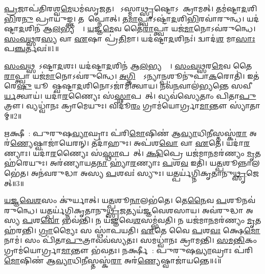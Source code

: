 \clearpage
{}
\setcounter{anuvakam}{0}

\ul{𑌪𑍍𑌰}𑌜𑌾𑌪॑𑌤𑌿𑌰𑌶𑍍𑌵\ul{𑌮𑍇}𑌧𑌮॑𑌸𑍃𑌜𑌤।
𑌸𑍋᳚𑌽𑌸𑍍𑌮𑌾\ul{𑌥𑍍𑌸𑍃}𑌷𑍍𑌟𑍋\-𑌽𑌪𑌾᳚𑌕𑍍𑌰𑌾𑌮𑌤𑍍।
𑌤𑌮॑𑌷𑍍𑌟𑌾\ul{𑌦}𑌶𑌿\ul{𑌭𑌿}𑌰\ul{𑌨𑍁} 𑌪𑍍𑌰𑌾𑌯𑍁॑𑌙𑍍𑌕𑍍𑌤।
𑌤𑌮𑌾᳚𑌪𑍍𑌨𑍋𑌤𑍍।
𑌤\ul{𑌮𑌾}𑌪𑍍𑌤𑍍𑌵𑌾\-𑌽𑌷𑍍𑌟𑌾॑\ul{𑌦}𑌶𑌿\ul{𑌭𑌿}𑌰𑌵𑌾॑\-𑌰𑍁𑌨𑍍𑌧।
𑌯𑌦॑𑌷𑍍𑌟𑌾\ul{𑌦}𑌶𑌿𑌨॑ 𑌆\ul{𑌲}𑌭𑍍𑌯𑌨𑍍𑌤𑍇᳚।
\ul{𑌯}𑌜𑍍𑌞\ul{𑌮𑍇}𑌵 𑌤𑍈\ul{𑌰𑌾}𑌪𑍍𑌤𑍍𑌵𑌾 𑌯𑌜॑\ul{𑌮𑌾}𑌨𑍋\-𑌽𑌵॑𑌰𑍁𑌨𑍍𑌧𑍇।
\ul{𑌸𑌂}\ul{𑌵}\ul{𑌥𑍍𑌸}𑌰\ul{𑌸𑍍𑌯} 𑌵𑌾 \ul{𑌏}𑌷𑌾 𑌪𑍍𑌰॑\ul{𑌤𑌿}𑌮𑌾।
𑌯𑌦॑𑌷𑍍𑌟𑌾\ul{𑌦}𑌶𑌿𑌨𑌃॑।
𑌦𑍍𑌵𑌾𑌦॑\ul{𑌶} 𑌮𑌾\ul{𑌸𑌾𑌃} 𑌪\ul{𑌞𑍍𑌚}𑌰𑍍𑌤𑌵𑌃॑॥1॥

\ul{𑌸𑌂}\ul{𑌵}\ul{𑌥𑍍𑌸}𑌰𑍋᳚\-𑌽𑌷𑍍𑌟𑌾\ul{𑌦}𑌶𑌃।
𑌯𑌦॑𑌷𑍍𑌟𑌾\ul{𑌦}𑌶𑌿𑌨॑ 𑌆\ul{𑌲}𑌭𑍍𑌯𑌨𑍍𑌤𑍇᳚।
\ul{𑌸𑌂}\ul{𑌵}\ul{𑌥𑍍𑌸}𑌰\ul{𑌮𑍇}𑌵 𑌤𑍈\ul{𑌰𑌾}𑌪𑍍𑌤𑍍𑌵𑌾 𑌯𑌜॑\ul{𑌮𑌾}𑌨𑍋\-𑌽𑌵॑𑌰𑍁𑌨𑍍𑌧𑍇।
\ul{𑌅}\ul{𑌗𑍍𑌨𑌿}𑌷𑍍𑌠𑍇᳚\-𑌽𑌨𑍍𑌯𑌾\ul{𑌨𑍍𑌪}𑌶𑍂𑌨𑍁॑𑌪𑌾\ul{𑌕}𑌰𑍋𑌤𑌿॑।
𑌇𑌤॑𑌰𑍇\ul{𑌷𑍁} 𑌯𑍂𑌪𑍇᳚𑌷𑍍𑌵𑌷𑍍𑌟𑌾\ul{𑌦}𑌶𑌿𑌨𑍋\-𑌽𑌜𑌾॑𑌮𑌿𑌤𑍍𑌵𑌾𑌯।
𑌨𑌵॑\ul{𑌨}𑌵𑌾𑌲॑𑌭𑍍𑌯𑌨𑍍𑌤𑍇 𑌸𑌵𑍀\ul{𑌰𑍍𑌯}𑌤𑍍𑌵𑌾𑌯॑।
𑌯𑌦𑌾॑\ul{𑌰}𑌣𑍍𑌯𑍈𑌃 𑌸॑\ul{𑌸𑍍𑌥𑌾}𑌪𑌯𑍇᳚𑌤𑍍।
𑌵𑍍𑌯𑌵॑𑌸𑍍𑌯𑍇𑌤𑌾𑌂 𑌪𑌿𑌤𑌾\ul{𑌪𑍁}𑌤𑍍𑌰𑍗।
𑌵𑍍𑌯𑌧𑍍𑌵𑌾॑𑌨𑌃 𑌕𑍍𑌰𑌾𑌮𑍇𑌯𑍁𑌃।
𑌵𑌿𑌦𑍂॑\ul{𑌰𑌂} 𑌗𑍍𑌰𑌾𑌮॑𑌯𑍋𑌰𑍍𑌗𑍍𑌰𑌾\ul{𑌮𑌾}𑌨𑍍𑌤𑍗 𑌸𑍍𑌯𑌾॑𑌤𑌾𑌮𑍍॥2॥

\ul{𑌋}𑌕𑍍𑌷𑍀𑌕𑌾᳚: 𑌪𑍁𑌰𑍁𑌷\ul{𑌵𑍍𑌯𑌾}𑌘𑍍𑌰𑌾𑌃 𑌪॑𑌰𑌿\ul{𑌮𑍋}𑌷𑌿𑌣॑ 𑌆\ul{𑌵𑍍𑌯𑌾}𑌧𑌿\ul{𑌨𑍀}𑌸𑍍𑌤𑌸𑍍𑌕॑\ul{𑌰𑌾} 𑌅𑌰॑\ul{𑌣𑍍𑌯𑍇}𑌷𑍍𑌵𑌾𑌜𑌾॑𑌯𑍇𑌰𑌨𑍍।
𑌤𑌦𑌾॑𑌹𑍁𑌃।
𑌅𑌪॑𑌶\ul{𑌵𑍋} 𑌵𑌾 \ul{𑌏}𑌤𑍇।
𑌯𑌦𑌾॑\ul{𑌰}𑌣𑍍𑌯𑌾𑌃।
𑌯𑌦𑌾॑\ul{𑌰}𑌣𑍍𑌯𑍈𑌃 𑌸॑\ul{𑌸𑍍𑌥𑌾}𑌪𑌯𑍇᳚𑌤𑍍।
\ul{𑌕𑍍𑌷𑌿}𑌪𑍍𑌰𑍇 𑌯𑌜॑𑌮𑌾\ul{𑌨}𑌮𑌰॑𑌣𑍍𑌯𑌂 \ul{𑌮𑍃}𑌤 𑌹॑𑌰𑍇𑌯𑍁𑌃।
𑌅𑌰॑𑌣𑍍𑌯𑌾𑌯𑌤\ul{𑌨𑌾} 𑌹𑍍𑌯𑌾॑\ul{𑌰}𑌣𑍍𑌯𑌾𑌃 \ul{𑌪}𑌶\ul{𑌵} 𑌇𑌤𑌿॑।
𑌯\ul{𑌤𑍍𑌪}𑌶𑍂𑌨𑍍𑌨𑌾𑌲𑌭𑍇॑𑌤।
𑌅𑌨॑𑌵𑌰𑍁𑌦𑍍𑌧𑌾 𑌅𑌸𑍍𑌯 \ul{𑌪}𑌶𑌵𑌃॑ 𑌸𑍍𑌯𑍁𑌃।
𑌯𑌤𑍍𑌪𑌰𑍍𑌯॑𑌗𑍍𑌨𑌿𑌕𑍃𑌤𑌾𑌨𑍁\ul{𑌥𑍍𑌸𑍃}𑌜𑍇𑌤𑍍॥3॥

\ul{𑌯}\ul{𑌜𑍍𑌞}\ul{𑌵𑍇}\ul{𑌶}𑌸𑌂 𑌕𑍁॑𑌰𑍍𑌯𑌾𑌤𑍍।
𑌯\ul{𑌤𑍍𑌪}𑌶𑍂\ul{𑌨𑌾}𑌲𑌭॑𑌤𑍇।
𑌤𑍇\ul{𑌨𑍈}𑌵 \ul{𑌪}𑌶𑍂𑌨𑌵॑𑌰𑍁𑌨𑍍𑌧𑍇।
𑌯𑌤𑍍𑌪𑌰𑍍𑌯॑𑌗𑍍𑌨𑌿𑌕𑍃𑌤𑌾𑌨𑍁\ul{𑌥𑍍𑌸𑍃}𑌜𑌤𑍍𑌯𑌯॑𑌜𑍍𑌞𑌵𑍇𑌶𑌸𑌾𑌯।
𑌅𑌵॑𑌰𑍁𑌦𑍍𑌧𑌾 𑌅𑌸𑍍𑌯 \ul{𑌪}𑌶\ul{𑌵𑍋} 𑌭𑌵॑𑌨𑍍𑌤𑌿।
𑌨 𑌯॑𑌜𑍍𑌞𑌵𑍇\ul{𑌶}𑌸𑌮𑍍𑌭॑𑌵𑌤𑌿।
𑌨 𑌯𑌜॑𑌮𑌾\ul{𑌨}𑌮𑌰॑𑌣𑍍𑌯𑌂 \ul{𑌮𑍃}𑌤 𑌹॑𑌰𑌨𑍍𑌤𑌿।
\ul{𑌗𑍍𑌰𑌾}𑌮𑍍𑌯𑍈𑌃 𑌸 𑌸𑍍𑌥𑌾॑𑌪𑌯𑌤𑌿।
\ul{𑌏}𑌤𑍇 𑌵𑍈 \ul{𑌪}𑌶\ul{𑌵𑌃} 𑌕𑍍𑌷𑍇\ul{𑌮𑍋} 𑌨𑌾𑌮॑।
𑌸𑌂 𑌪𑌿॑𑌤𑌾\ul{𑌪𑍁}𑌤𑍍𑌰𑌾𑌵𑌵॑𑌸𑍍𑌯𑌤𑌃।
𑌸𑌮𑌧𑍍𑌵𑌾॑𑌨𑌃 𑌕𑍍𑌰𑌾𑌮𑌨𑍍𑌤𑌿।
\ul{𑌸}\ul{𑌮}\ul{𑌨𑍍𑌤𑌿}𑌕𑌂 𑌗𑍍𑌰𑌾𑌮॑𑌯𑍋𑌰𑍍𑌗𑍍𑌰𑌾\ul{𑌮𑌾}𑌨𑍍𑌤𑍗 𑌭॑𑌵𑌤𑌃।
𑌨𑌰𑍍𑌕𑍍𑌷𑍀𑌕𑌾᳚: 𑌪𑍁𑌰𑍁𑌷\ul{𑌵𑍍𑌯𑌾}𑌘𑍍𑌰𑌾𑌃 𑌪॑𑌰𑌿\ul{𑌮𑍋}𑌷𑌿𑌣॑ 𑌆\ul{𑌵𑍍𑌯𑌾}𑌧𑌿\ul{𑌨𑍀}𑌸𑍍𑌤𑌸𑍍𑌕॑\ul{𑌰𑌾} 𑌅𑌰॑\ul{𑌣𑍍𑌯𑍇}𑌷𑍍𑌵𑌾𑌜𑌾॑𑌯𑌨𑍍𑌤𑍇॥4॥\anuvakamend[\ul{𑌋}𑌤𑌵𑌃॑ 𑌸𑍍𑌯𑌾𑌤𑌾𑌮𑍁\ul{𑌥𑍍𑌸𑍃}𑌜𑍇𑌥𑍍𑌸𑍍𑌯॑\ul{𑌤}𑌸𑍍𑌤𑍍𑌰𑍀𑌣𑌿॑ 𑌚]


